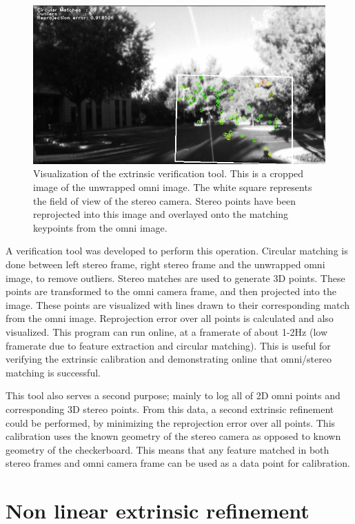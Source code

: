 \begin{figure}[h!]
  \centering
    \includegraphics[width=1.0\textwidth]{chapters/images/circ_matches}
  \caption{Visualization of the extrinsic verification tool. This is a cropped image of the unwrapped omni image.  The white square represents the field of view of the stereo camera.  Stereo points have been reprojected into this image and overlayed onto the matching keypoints from the omni image. }
  \label{fig:circ_matches}
\end{figure}

A verification tool was developed to perform this operation.  Circular matching is done between left stereo frame, right stereo frame and the unwrapped omni image, to remove outliers.  Stereo matches are used to generate 3D points.  These points are transformed to the omni camera frame, and then projected into the image.  These points are visualized with lines drawn to their corresponding match from the omni image.  Reprojection error over all points is calculated and also visualized.  This program can run online, at a framerate of about 1-2Hz (low framerate due to feature extraction and circular matching).  This is useful for verifying the extrinsic calibration and demonstrating online that omni/stereo matching is successful.

This tool also serves a second purpose; mainly to log all of 2D omni points and corresponding 3D stereo points.  From this data, a second extrinsic refinement could be performed, by minimizing the reprojection error over all points.  This calibration uses the known geometry of the stereo camera as opposed to known geometry of the checkerboard.  This means that any feature matched in both stereo frames and omni camera frame can be used as a data point for calibration.

\section{Non linear extrinsic refinement}
\label{sec:g2o_extrinsic_cal}


